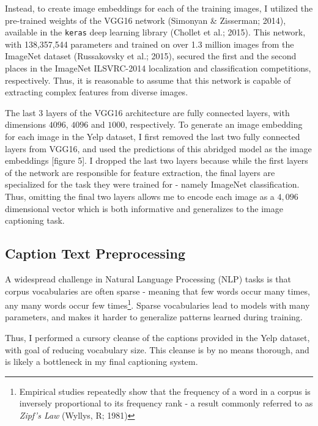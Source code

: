 \documentclass[letterpaper, 10 pt, conference]{ieeeconf}
\newcommand{\code}[1]{\colorbox{light-gray}{\texttt{#1}}}
\begin{document}
Instead, to create image embeddings for each of the training images, I utilized the pre-trained weights of the VGG16 network (Simonyan \& Zisserman; 2014), available in the \code{keras} deep learning library (Chollet et al.; 2015). This network, with 138,357,544 parameters and trained on over 1.3 million images from the ImageNet dataset (Russakovsky et al.; 2015), secured the first and the second places in the ImageNet ILSVRC-2014 localization and classification competitions, respectively. Thus, it is reasonable to assume that this network is capable of extracting complex features from diverse images. 

The last 3 layers of the VGG16 architecture are fully connected layers, with dimensions $4096$, $4096$ and $1000$, respectively. To generate an image embedding for each image in the Yelp dataset, I first removed the last two fully connected layers from VGG16, and used the predictions of this abridged model as  the image embeddings [figure 5]. I dropped the last two layers because while the first layers of the network are responsible for feature extraction, the final layers are specialized for the task they were trained for - namely ImageNet classification. Thus, omitting the final two layers allows me to encode each image as a $4,096$ dimensional vector which is both informative and generalizes to the image captioning task.


\subsection{Caption Text Preprocessing}

A widespread challenge in Natural Language Processing (NLP) tasks is that corpus vocabularies are often sparse - meaning that few words occur many times, any many words occur few times\footnote{Empirical studies repeatedly show that the frequency of a word in a corpus is inversely proportional to its frequency rank -  a result commonly referred to as \emph{Zipf's Law} (Wyllys, R; 1981)}. Sparse vocabularies lead to models with many parameters, and makes it harder to generalize patterns learned during training. 

Thus, I performed a cursory cleanse of the captions provided in the Yelp dataset, with goal of reducing vocabulary size. This cleanse is by no means thorough, and is likely a bottleneck in my final captioning system. 
\end{document}
